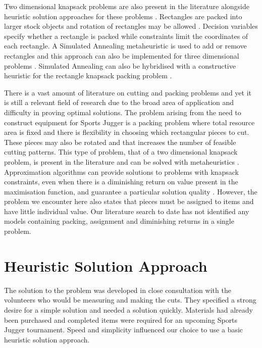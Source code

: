 \documentclass[10pt,a4paper]{article}
\begin{document}
Two dimensional knapsack problems are also present in the literature alongside heuristic solution approaches for these problems \cite{Egeblad2009} \cite{Leung2012}. Rectangles are packed into larger stock objects and rotation of rectangles may be allowed \cite{Egeblad2009}. Decision variables specify whether a rectangle is packed while constraints limit the coordinates of each rectangle. A Simulated Annealing metaheuristic is used to add or remove rectangles and this approach can also be implemented for three dimensional problems \cite{Egeblad2009}. Simulated Annealing can also be hybridised with a constructive heuristic for the rectangle knapsack packing problem \cite{Leung2012}.

There is a vast amount of literature on cutting and packing problems \cite{SweeneyRidenour} and yet it is still a relevant field of research due to the broad area of application and difficulty in proving optimal solutions. The problem arising from the need to construct equipment for Sports Jugger is a packing problem where total resource area is fixed and there is flexibility in choosing which rectangular pieces to cut. These pieces may also be rotated and that increases the number of feasible cutting patterns. This type of problem, that of a two dimensional knapsack problem, is present in the literature and can be solved with metaheuristics \cite{Egeblad2009}. Approximation algorithms can provide solutions to problems with knapsack constraints, even when there is a diminishing return on value present in the maximisation function, and guarantee a particular solution quality \cite{jonlee2009}. However, the problem we encounter here also states that pieces must be assigned to items and have little individual value.  Our literature search to date has not identified any models containing packing, assignment and diminishing returns in a single problem.

\label{section:litreview}
\section{Heuristic Solution Approach}
\label{section:heuristics}
The solution to the problem was developed in close consultation with the volunteers who would be measuring and making the cuts. They specified a strong desire for a simple solution and needed a solution quickly. Materials had already been purchased and completed items were required for an upcoming Sports Jugger tournament. Speed and simplicity influenced our choice to use a basic heuristic solution approach.
\end{document}

